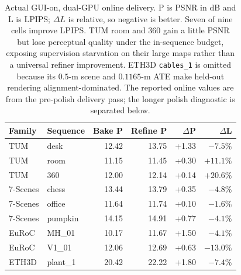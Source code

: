 \begin{table}[t]
\centering\small
\setlength{\tabcolsep}{2.7pt}
\begin{tabular}{@{}llrrrr@{}}
\toprule
Family & Sequence & Bake P & Refine P & $\Delta$P & $\Delta$L \\
\midrule
TUM & desk & 12.42 & 13.75 & +1.33 & $-7.5\%$ \\
TUM & room & 11.15 & 11.45 & +0.30 & $+11.1\%$ \\
TUM & 360 & 12.00 & 12.14 & +0.14 & $+20.6\%$ \\
7-Scenes & chess & 13.44 & 13.79 & +0.35 & $-4.8\%$ \\
7-Scenes & office & 11.64 & 11.74 & +0.10 & $-1.6\%$ \\
7-Scenes & pumpkin & 14.15 & 14.91 & +0.77 & $-4.1\%$ \\
EuRoC & MH\_01 & 10.17 & 11.67 & +1.50 & $-4.1\%$ \\
EuRoC & V1\_01 & 12.06 & 12.69 & +0.63 & $-13.0\%$ \\
ETH3D & plant\_1 & 20.42 & 22.22 & +1.80 & $-7.4\%$ \\
\bottomrule
\end{tabular}
\caption[Online delivery, GUI on, dual GPU]{Actual GUI-on, dual-GPU online delivery. P is PSNR in dB and L is
LPIPS; $\Delta L$ is relative, so negative is better. Seven of nine cells
improve LPIPS. TUM room and 360 gain a little PSNR but lose perceptual quality
under the in-sequence budget, exposing supervision starvation on their large
maps rather than a universal refiner improvement. ETH3D \texttt{cables\_1} is
omitted because its $0.5$-m scene and $0.1165$-m ATE make held-out rendering
alignment-dominated. The reported online values are from the pre-polish
delivery pass; the longer polish diagnostic is separated below.}
\label{tab:online}
\end{table}
